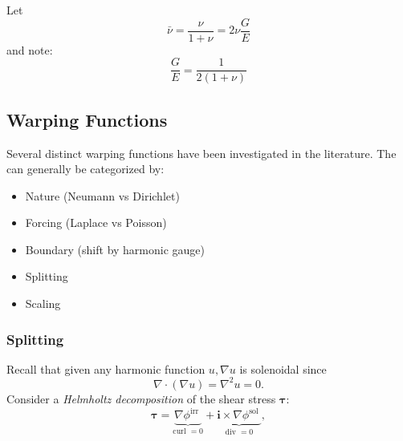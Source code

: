 Let 
\begin{equation*}
\bar{\nu} = \frac{\nu}{1+\nu} = 2\nu \frac{G}{E}
\end{equation*}
and note:
\begin{equation*}
\frac{G}{E} = \frac{1}{2(1+\nu)}
\end{equation*}

\subsection{Warping Functions}
Several distinct warping functions have been investigated in the literature. 
The can generally be categorized by:
\begin{itemize}
    \item Nature (Neumann vs Dirichlet)
    \item Forcing (Laplace vs Poisson)
    \item Boundary (shift by harmonic gauge)
    \item Splitting
    \item Scaling
\end{itemize}

\subsubsection{Splitting}
Recall that given any harmonic function $u, \nabla u$ is solenoidal since
$$
\nabla \cdot(\nabla u)=\nabla^2 u=0 .
$$
Consider a \emph{Helmholtz decomposition} of the shear stress \(\bm{\tau}\):
\begin{equation}
\boldsymbol{\tau}=\underbrace{\nabla \phi^{\text {irr }}}_{\text {curl }=0}+\underbrace{\mathbf{i}\times \nabla \phi^{\text {sol }}}_{\text {div }=0},
\label{eq:helmoltz-shear-stress}
\end{equation}

